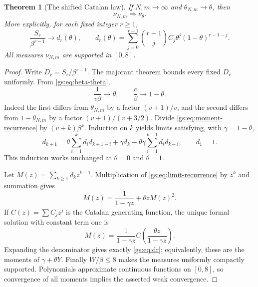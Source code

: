 \documentclass[11pt,a4paper]{article}
\numberwithin{equation}{section}
\newtheorem{theorem}{Theorem}[section]
\theoremstyle{definition}
\theoremstyle{remark}
\begin{document}
\begin{theorem}[The shifted Catalan law]\label{gs:thm:spectral}
If $N,m\to\infty$ and $\theta_{N,m}\to\theta$, then
\begin{equation}\label{gs:eq:weak}
 \nu_{N,m}\Longrightarrow\nu_\theta.
\end{equation}
More explicitly, for each fixed integer $r\ge1$,
\begin{equation}\label{gs:eq:dr}
 \frac{S_r}{\beta^{r-1}}\longrightarrow d_r(\theta),\qquad
 d_r(\theta)=\sum_{j=0}^{r-1}\binom{r-1}{j}
                 C_j\theta^j(1-\theta)^{r-1-j}.
\end{equation}
All measures $\nu_{N,m}$ are supported in $[0,8]$.
\end{theorem}
\begin{proof}
Write $D_r=S_r/\beta^{r-1}$. The majorant theorem bounds every fixed
$D_r$ uniformly. From \eqref{gs:eq:beta-theta},
\begin{equation}\label{gs:eq:limit-parameters}
 \frac1{v\beta}\to\theta,\qquad
 \frac c\beta\to1-\theta.
\end{equation}
Indeed the first differs from $\theta_{N,m}$ by a factor $(v+1)/v$,
and the second differs from $1-\theta_{N,m}$ by a factor
$(v+1)/(v+3/2)$. Divide \eqref{gs:eq:moment-recurrence} by
$(v+k)\beta^k$. Induction on $k$ yields limits satisfying, with
$\gamma=1-\theta$,
\begin{equation}\label{gs:eq:limit-recurrence}
 d_{k+1}=\theta\sum_{i=1}^kd_i d_{k+1-i}
       +\gamma d_k
       -\theta\gamma\sum_{i=1}^{k-1}d_i d_{k-i},\qquad d_1=1.
\end{equation}
This induction works unchanged at $\theta=0$ and $\theta=1$.

Let $M(z)=\sum_{k\ge1}d_kz^{k-1}$. Multiplication of
\eqref{gs:eq:limit-recurrence} by $z^k$ and summation gives
\begin{equation}\label{gs:eq:Mquadratic}
 M(z)=\frac1{1-\gamma z}+\theta zM(z)^2.
\end{equation}
If $C(z)=\sum C_jz^j$ is the Catalan generating function, the unique
formal solution with constant term one is
\begin{equation}\label{gs:eq:Msolution}
 M(z)=\frac1{1-\gamma z}
          C\!\left(\frac{\theta z}{1-\gamma z}\right).
\end{equation}
Expanding the denominator gives exactly \eqref{gs:eq:dr}; equivalently,
these are the moments of $\gamma+\theta Y$.
Finally $W/\beta\le8$ makes the measures uniformly compactly supported.
Polynomials approximate continuous functions on $[0,8]$, so convergence
of all moments implies the asserted weak convergence.
\end{proof}
\end{document}
